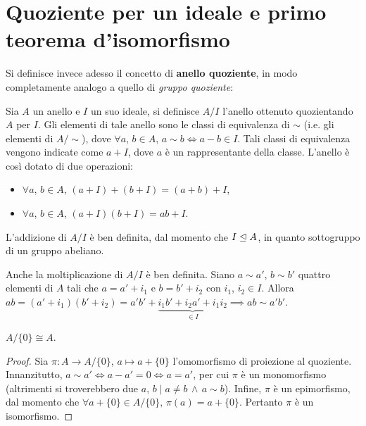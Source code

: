 \section{Quoziente per un ideale e primo teorema d'isomorfismo}

Si definisce invece adesso il concetto di \textbf{anello quoziente}, in modo
completamente analogo a quello di \textit{gruppo quoziente}:

\begin{definition}
    Sia $A$ un anello e $I$ un suo ideale, si definisce $A/I$ l'anello ottenuto
    quozientando $A$ per $I$. Gli elementi di tale anello sono le classi di equivalenza di $\sim$ (i.e. gli elementi di $A/{\sim}$), dove $\forall a$, $b \in A$, $a\sim b \iff a-b \in I$. Tali classi di equivalenza vengono indicate come
    $a + I$, dove $a$ è un rappresentante della classe. L'anello è così dotato di due operazioni:

    \begin{itemize}
        \item $\forall a$, $b \in A$, $(a+I)+(b+I)=(a+b)+I$,
        \item $\forall a$, $b \in A$, $(a+I)(b+I)=ab+I$.
    \end{itemize}
\end{definition}

\begin{remark*}
    L'addizione di $A/I$ è ben definita, dal momento che $I \mathrel{\unlhd} A$, in quanto sottogruppo di un gruppo abeliano.
\end{remark*}

\begin{remark*}
    Anche la moltiplicazione di $A/I$ è ben definita. Siano $a\sim a'$, $b \sim b'$ quattro elementi di $A$ tali che $a = a' + i_1$ e $b = b' + i_2$ con $i_1$, $i_2 \in I$. Allora $ab=(a'+i_1)(b'+i_2)=a'b' + \underbrace{i_1b' + i_2a' + i_1i_2}_{\in I} \implies ab \sim a'b'$.
\end{remark*}

\begin{proposition}
    \label{prop:quoziente_pieno}
    $A/\{0\} \cong A$.
\end{proposition}

\begin{proof}
    Sia $\pi : A \to A/\{0\}$, $a \mapsto a + \{0\}$ l'omomorfismo di proiezione
    al quoziente. Innanzitutto, $a \sim a' \iff a-a'=0 \iff a=a'$, per cui $\pi$ è
    un monomorfismo (altrimenti si troverebbero due $a$, $b \mid a \neq b \,\land\, a \sim b$). Infine, $\pi$ è un epimorfismo, dal momento che $\forall a + \{0\} \in A/\{0\}, \, \pi(a) = a + \{0\}$. Pertanto $\pi$ è un isomorfismo.
\end{proof}

